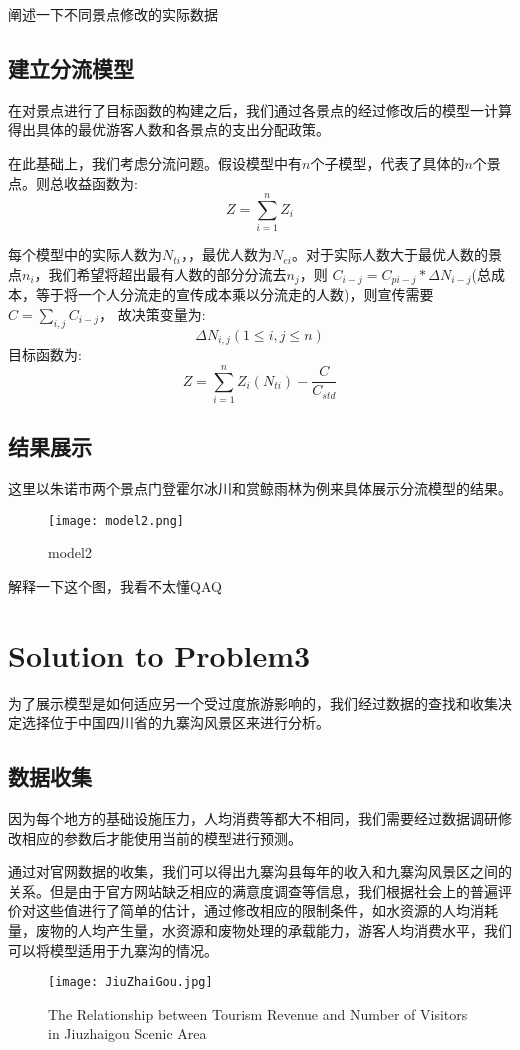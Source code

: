\documentclass[12pt]{article}  %
\begin{document}
阐述一下不同景点修改的实际数据
\subsection{建立分流模型}
在对景点进行了目标函数的构建之后，我们通过各景点的经过修改后的模型一计算得出具体的最优游客人数和各景点的支出分配政策。

在此基础上，我们考虑分流问题。假设模型中有$n$个子模型，代表了具体的$n$个景点。则总收益函数为:
\begin{equation}
    Z = \sum_{i=1}^{n} Z_i
\end{equation}

每个模型中的实际人数为$N_{ti}$，，最优人数为$N_{ei}$。对于实际人数大于最优人数的景点$n_i$，我们希望将超出最有人数的部分分流去$n_j$，则
$C_{i-j} = C_{pi-j}*\Delta N_{i-j}$(总成本，等于将一个人分流走的宣传成本乘以分流走的人数)，则宣传需要$C = \sum_{i,j} C_{i-j}$，
故决策变量为:
\begin{equation}
    \Delta N_{i,j} (1 \leq i,j \leq n)
\end{equation}
目标函数为:
\begin{equation}
	Z = \sum_{i=1}^{n} Z_i(N_{ti}) - \frac{C}{C_{std}}
\end{equation}
\subsection{结果展示}
这里以朱诺市两个景点门登霍尔冰川和赏鲸雨林为例来具体展示分流模型的结果。
\begin{figure}[H]
	\centering
	\texttt{[image: model2.png]}
	\caption{model2}\label{fig:model2}
\end{figure}
解释一下这个图，我看不太懂QAQ

\section{Solution to Problem3}
为了展示模型是如何适应另一个受过度旅游影响的，我们经过数据的查找和收集决定选择位于中国四川省的九寨沟风景区来进行分析。
\subsection{数据收集}
因为每个地方的基础设施压力，人均消费等都大不相同，我们需要经过数据调研修改相应的参数后才能使用当前的模型进行预测。

通过对官网数据的收集\cite{8}，我们可以得出九寨沟县每年的收入和九寨沟风景区之间的关系。但是由于官方网站缺乏相应的满意度调查等信息，我们根据社会上的普遍评价对这些值进行了简单的估计，通过修改相应的限制条件，如水资源的人均消耗量，废物的人均产生量，水资源和废物处理的承载能力，游客人均消费水平，我们可以将模型适用于九寨沟的情况。
\begin{figure}[H]
	\centering
	\texttt{[image: JiuZhaiGou.jpg]}
	\caption{The Relationship between Tourism Revenue and Number of Visitors in Jiuzhaigou Scenic Area}\label{fig:JiuZhaiGou}
\end{figure}
\end{document}
